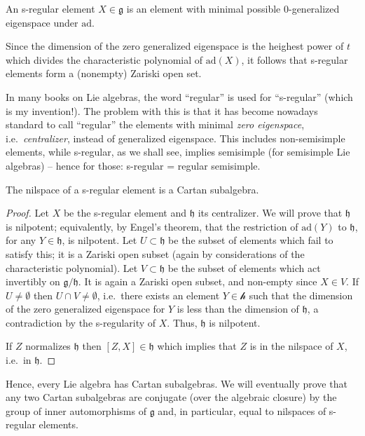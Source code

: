 \begin{definition}
 An s-regular element $X\in\mathfrak g$ is an element with minimal possible $0$-generalized eigenspace under $\text{ad}$.
\end{definition}

Since the dimension of the zero generalized eigenspace is the heighest power of $t$ which divides the characteristic polynomial of $\text{ad}(X)$, it follows that s-regular elements form a (nonempty) Zariski open set.

\begin{remark}
In many books on Lie algebras, the word ``regular'' is used for ``s-regular'' (which is my invention!). The problem with this is that it has become nowadays standard to call ``regular'' the elements with minimal \emph{zero eigenspace}, i.e.\ \emph{centralizer}, instead of generalized eigenspace. This includes non-semisimple elements, while s-regular, as we shall see, implies semisimple (for semisimple Lie algebras) -- hence for those: s-regular = regular semisimple.
\end{remark}

\begin{proposition}
 The nilspace of a s-regular element is a Cartan subalgebra.
\end{proposition}

\begin{proof}
 Let $X$ be the s-regular element and $\mathfrak h$ its centralizer. We will prove that $\mathfrak h$ is nilpotent; equivalently, by Engel's theorem, that the restriction of $\text{ad}(Y)$ to $\mathfrak h$, for any $Y\in\mathfrak h$, is nilpotent. Let $U\subset\mathfrak h$ be the subset of elements which fail to satisfy this; it is a Zariski open subset (again by considerations of the characteristic polynomial). Let $V\subset\mathfrak h$ be the subset of elements which act invertibly on $\mathfrak g/\mathfrak h$. It is again a Zariski open subset, and non-empty since $X\in V$. If $U\ne\emptyset$ then $U\cap V\ne\emptyset$, i.e.\ there exists an element $Y\in\mathcal h$ such that the dimension of the zero generalized eigenspace for $Y$ is less than the dimension of $\mathfrak h$, a contradiction by the s-regularity of $X$. Thus, $\mathfrak h$ is nilpotent.

 If $Z$ normalizes $\mathfrak h$ then $[Z,X]\in\mathfrak h$ which implies that $Z$ is in the nilspace of $X$, i.e.\ in $\mathfrak h$.
\end{proof}

Hence, every Lie algebra has Cartan subalgebras. We will eventually prove that any two Cartan subalgebras are conjugate (over the algebraic closure) by the group of inner automorphisms of $\mathfrak g$ and, in particular, equal to nilspaces of s-regular elements.


